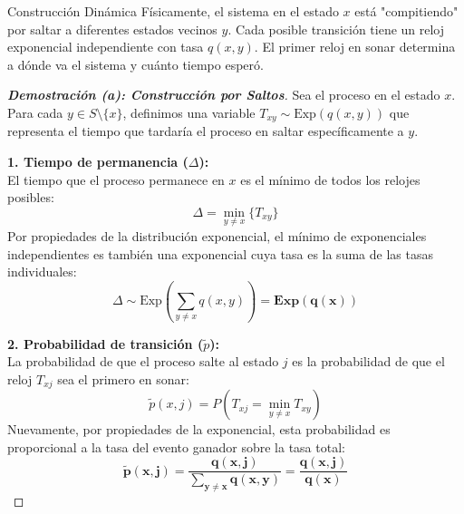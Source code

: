 \documentclass[10pt,a4paper]{article}
\begin{document}
\vspace{2mm}

\begin{nota}{Construcción Dinámica}
    Físicamente, el sistema en el estado $x$ está "compitiendo" por saltar a diferentes estados vecinos $y$. Cada posible transición tiene un reloj exponencial independiente con tasa $q(x,y)$. El primer reloj en sonar determina a dónde va el sistema y cuánto tiempo esperó.
\end{nota}

\begin{proof}[\textbf{Demostración (a): Construcción por Saltos}]
    Sea el proceso en el estado $x$. Para cada $y \in S \setminus \{x\}$, definimos una variable $T_{xy} \sim \text{Exp}(q(x,y))$ que representa el tiempo que tardaría el proceso en saltar específicamente a $y$.
    
    \textbf{1. Tiempo de permanencia ($\Delta$):} \\
    El tiempo que el proceso permanece en $x$ es el mínimo de todos los relojes posibles:
    \[ \Delta = \min_{y \neq x} \{ T_{xy} \} \]
    Por propiedades de la distribución exponencial, el mínimo de exponenciales independientes es también una exponencial cuya tasa es la suma de las tasas individuales:
    \[ \Delta \sim \text{Exp}\left( \sum_{y \neq x} q(x,y) \right) = \mathbf{\text{Exp}(q(x))} \]
    
    \textbf{2. Probabilidad de transición ($\tilde{p}$):} \\
    La probabilidad de que el proceso salte al estado $j$ es la probabilidad de que el reloj $T_{xj}$ sea el primero en sonar:
    \[ \tilde{p}(x,j) = P(T_{xj} = \min_{y \neq x} T_{xy}) \]
    Nuevamente, por propiedades de la exponencial, esta probabilidad es proporcional a la tasa del evento ganador sobre la tasa total:
    \[ \mathbf{\tilde{p}(x,j) = \frac{q(x,j)}{\sum_{y \neq x} q(x,y)} = \frac{q(x,j)}{q(x)}} \]
\end{proof}

\newpage
\end{document}

